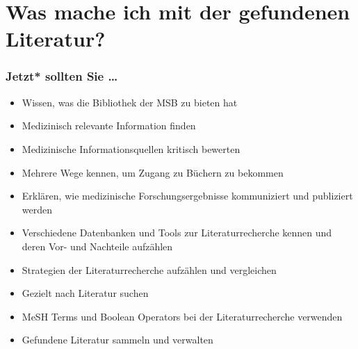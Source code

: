 \documentclass{beamer}
\begin{document}


\section{Was mache ich mit der gefundenen Literatur?}






\begin{frame}

\frametitle{Jetzt* sollten Sie \dots}


\begin{itemize}
\item
Wissen, was die Bibliothek der MSB zu bieten hat
\item 
Medizinisch relevante Information finden
\item 
Medizinische Informationsquellen kritisch bewerten
\item 
Mehrere Wege kennen, um Zugang zu Büchern zu bekommen
\item 
Erklären, wie medizinische Forschungsergebnisse kommuniziert und publiziert werden
\item 
Verschiedene Datenbanken und Tools zur Literaturrecherche kennen und deren Vor- und Nachteile aufzählen
\item 
Strategien der Literaturrecherche aufzählen und vergleichen
\item 
Gezielt nach Literatur suchen
\item 
MeSH Terms und Boolean Operators bei der Literaturrecherche verwenden
\item 
Gefundene Literatur sammeln und verwalten
\end{itemize}

\end{frame}
\end{document}

